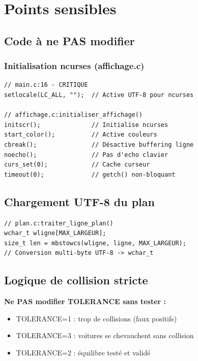\documentclass[12pt,a4paper]{article}
\begin{document}
\section{Points sensibles}

\subsection{Code à ne PAS modifier}

\subsubsection{Initialisation ncurses (affichage.c)}

\begin{lstlisting}
// main.c:16 - CRITIQUE
setlocale(LC_ALL, "");  // Active UTF-8 pour ncurses

// affichage.c:initialiser_affichage()
initscr();              // Initialise ncurses
start_color();          // Active couleurs
cbreak();               // Désactive buffering ligne
noecho();               // Pas d'echo clavier
curs_set(0);            // Cache curseur
timeout(0);             // getch() non-bloquant
\end{lstlisting}

\subsection{Chargement UTF-8 du plan}

\begin{lstlisting}
// plan.c:traiter_ligne_plan()
wchar_t wligne[MAX_LARGEUR];
size_t len = mbstowcs(wligne, ligne, MAX_LARGEUR);
// Conversion multi-byte UTF-8 -> wchar_t
\end{lstlisting}

\subsection{Logique de collision stricte}

\textbf{Ne PAS modifier TOLERANCE sans tester :}

\begin{itemize}
    \item TOLERANCE=1 : trop de collisions (faux positifs)
    \item TOLERANCE=3 : voitures se chevauchent sans collision
    \item TOLERANCE=2 : équilibre testé et validé
\end{itemize}
\end{document}
